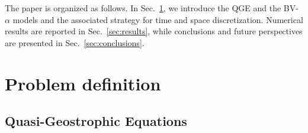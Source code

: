 \documentclass[11pt,a4paper]{article}
\begin{document}
The paper is organized as follows. In Sec.~\ref{sec:pbd}, we introduce the QGE and the BV-$\alpha$ models and the associated 
strategy for time and space discretization.
Numerical results are reported in Sec.~\ref{sec:results}, while conclusions
and future perspectives are presented in Sec.~\ref{sec:conclusions}.






\section{Problem definition}
\label{sec:pbd}

\subsection{Quasi-Geostrophic Equations}
\label{sec:NS Equations}
\end{document}
